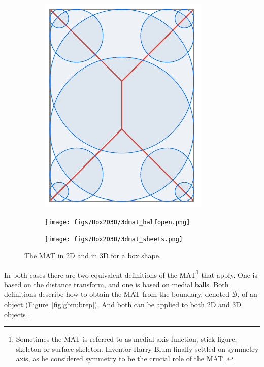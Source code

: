 \begin{figure}
	\centering
	\begin{subfigure}{0.26\linewidth}
		\includegraphics[width=\linewidth]{figs/Box2D3D/3dmat_2d.pdf}
		\label{fig:3dmat_2d}
	\end{subfigure}
	\quad
	\begin{subfigure}{0.33\linewidth}
		\texttt{[image: figs/Box2D3D/3dmat\_halfopen.png]}
		\label{fig:3dmat_halfopen}
	\end{subfigure}
	\quad
	\begin{subfigure}{0.33\linewidth}
		\texttt{[image: figs/Box2D3D/3dmat\_sheets.png]}
		\label{fig:3dmat_sheets}
	\end{subfigure}
	\caption{The MAT in 2D and in 3D for a box shape.}
	\label{fig:3dmat}
\end{figure}
In both cases there are two equivalent definitions of the MAT\footnote{Sometimes the MAT is referred to as medial axis function, stick figure, skeleton or surface skeleton.
	Inventor Harry Blum finally settled on symmetry axis, as he considered symmetry to be the crucial role of the MAT \citep{Blum73}.} that apply. 
One is based on the distance transform, and one is based on medial balls. 
Both definitions describe how to obtain the MAT from the boundary, denoted $
\mathcal{B}$, of an object (Figure~\ref{fig:gbm:brep}).
And both can be applied to both 2D and 3D objects .

